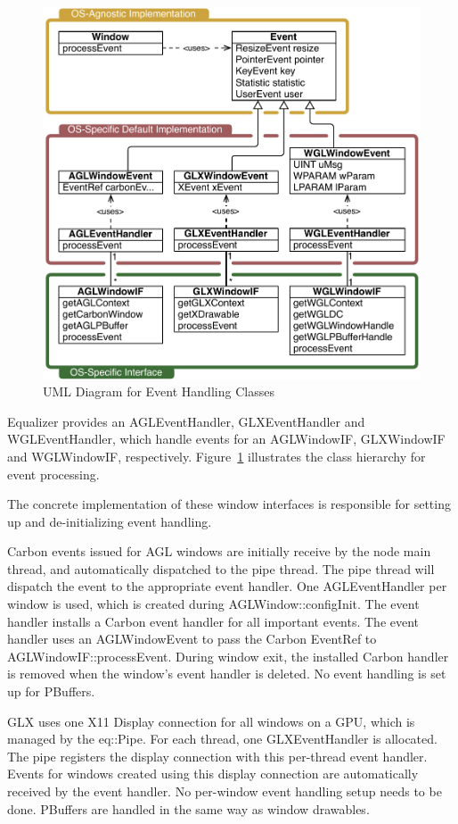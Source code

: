 \documentclass[10pt,a4]{scrartcl}
\newcommand{\fig}[1]{Figure~\ref{#1}}
\begin{document}
\begin{figure}
  \includegraphics[width=.618\textwidth]{images/eventUML.pdf}
  {\caption{\label{fEventUML}UML Diagram for Event Handling Classes}}
\end{figure}
Equalizer provides an \textsf{AGLEvent\-Handler},
\textsf{GLXEventHandler} and \textsf{WGL\-Event\-Handler}, which handle
events for an \textsf{AGLWindowIF}, \textsf{GLXWindowIF} and
\textsf{WGL\-Win\-dowIF}, respectively. \fig{fEventUML} illustrates the
class hierarchy for event processing.

The concrete implementation of these window interfaces is responsible
for setting up and de-initializing event handling.

Carbon events issued for AGL windows are initially receive by the node
main thread, and automatically dispatched to the pipe thread. The pipe
thread will dispatch the event to the appropriate event handler. One
\textsf{AGLEventHandler} per window is used, which is created during
\textsf{AGLWindow::configInit}. The event handler installs a Carbon
event handler for all important events. The event handler uses an
\textsf{AGLWindowEvent} to pass the Carbon \textsf{EventRef} to
\textsf{AGLWindowIF::processEvent}. During window exit, the installed
Carbon handler is removed when the window's event handler is deleted. No
event handling is set up for PBuffers.

GLX uses one X11 Display connection for all windows on a GPU, which is
managed by the \textsf{eq::Pipe}. For each thread, one
\textsf{GLXEventHandler} is allocated. The pipe registers the display
connection with this per-thread event handler. Events for windows
created using this display connection are automatically received by the
event handler. No per-window event handling setup needs to be
done. PBuffers are handled in the same way as window drawables.
\end{document}

